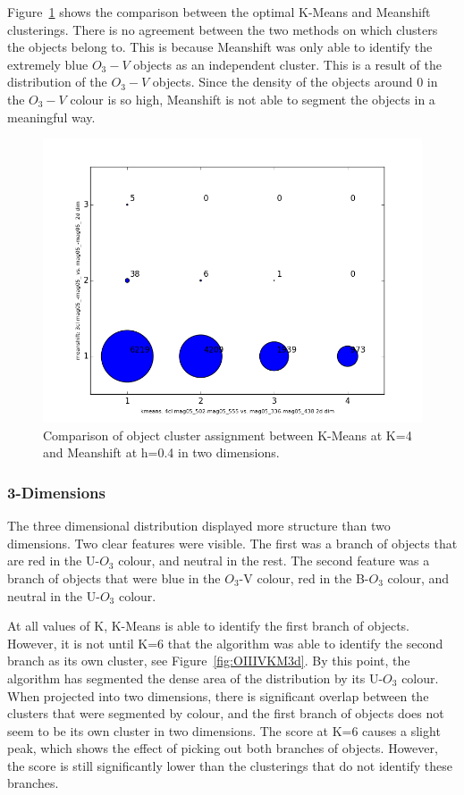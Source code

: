 Figure~\ref{fig:OIIIV2dcomp} shows the comparison between the optimal K-Means and Meanshift clusterings.
There is no agreement between the two methods on which clusters the objects belong to.
This is because Meanshift was only able to identify the extremely blue $O_{3} - V$ objects as an independent cluster. 
This is a result of the distribution of the $O_{3} - V$ objects.
Since the density of the objects around 0 in the $O_{3} - V$ colour is so high, Meanshift is not able to segment the objects in a meaningful way.

\begin{figure}[H]
\centering
\includegraphics[width=\linewidth]{figs/unsuccessful/kmeans-4cl_mag05_502-mag05_555_vs_meanshift-3cl_mag05_-mag05__mag05_-mag05__2ddim_compare}
\caption{Comparison of object cluster assignment between K-Means at K=4 and Meanshift at h=0.4 in two dimensions.}
\label{fig:OIIIV2dcomp}
\end{figure}

\subsubsection{3-Dimensions}
The three dimensional distribution displayed more structure than two dimensions.
Two clear features were visible. 
The first was a branch of objects that are red in the U-$O_{3}$ colour, and neutral in the rest.
The second feature was a branch of objects that were blue in the $O_{3}$-V colour, red in the B-$O_{3}$ colour, and neutral in the U-$O_{3}$ colour.

At all values of K, K-Means is able to identify the first branch of objects. However, it is not until K=6 that the algorithm was able to identify the second branch as its own cluster, see Figure~\ref{fig:OIIIVKM3d}.
By this point, the algorithm has segmented the dense area of the distribution by its U-$O_{3}$ colour.
When projected into two dimensions, there is significant overlap between the clusters that were segmented by colour, and the first branch of objects does not seem to be its own cluster in two dimensions.
The score at K=6 causes a slight peak, which shows the effect of picking out both branches of objects.
However, the score is still significantly lower than the clusterings that do not identify these branches.

